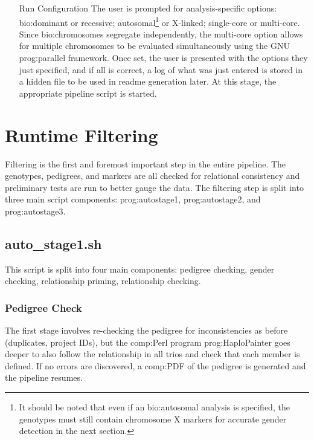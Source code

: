 \begin{enumerate}[labelsep=1em, align=left, labelwidth=4em, labelindent=2em, leftmargin=*]
{\begin{enumerate}
\end{enumerate}

}
\item[Run Configuration]{The user is prompted for analysis-specific options: \gls{bio:dominant} or recessive; autosomal\footnote{It should be noted that even if an \gls{bio:autosomal} analysis is specified, the genotypes must still contain chromosome X markers for accurate gender detection in the next section.} or X-linked; single-core or multi-core. Since \gls{bio:chromosomes} segregate independently, the multi-core option allows for multiple chromosomes to be evaluated simultaneously using the GNU \gls{prog:parallel} framework. Once set, the user is presented with the options they just specified, and if all is correct, a log of what was just entered is stored in a hidden file to be used in readme generation later. At this stage, the appropriate pipeline script is started.}
\end{enumerate}



\section{Runtime Filtering}

Filtering is the first and foremost important step in the entire pipeline. The genotypes, pedigrees, and markers are all checked for relational consistency and preliminary tests are run to better gauge the data. The filtering step is split into three main script components: \gls{prog:autostage1}, \gls{prog:autostage2}, and \gls{prog:autostage3}.

\subsection{auto\_stage1.sh}

This script is split into four main components: pedigree checking, gender checking, relationship priming, relationship checking.

\subsubsection{Pedigree Check}

The first stage involves re-checking the pedigree for inconsistencies as before (duplicates, project IDs), but the \gls{comp:Perl} program \gls{prog:HaploPainter} goes deeper to also follow the relationship in all trios and check that each member is defined. If no errors are discovered, a \gls{comp:PDF} of the pedigree is generated and the pipeline resumes.

